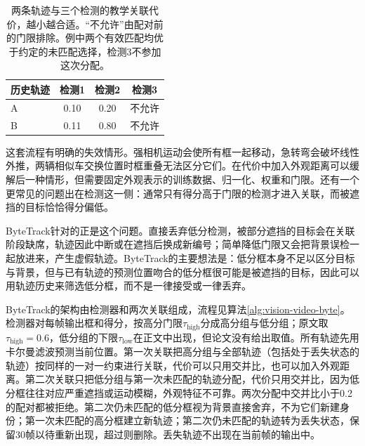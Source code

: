 \begin{table}[htbp]
  \centering
  \begin{tabular}{lccc}
    \toprule
    历史轨迹 & 检测1 & 检测2 & 检测3\\
    \midrule
    A & 0.10 & 0.20 & 不允许\\
    B & 0.11 & 0.80 & 不允许\\
    \bottomrule
  \end{tabular}
  \caption{两条轨迹与三个检测的教学关联代价，越小越合适。“不允许”由配对前的门限排除。例中两个有效匹配均优于约定的未匹配选择，检测3不参加这次分配。}
  \label{tab:vision-association-cost}
\end{table}

这套流程有明确的失效情形。强相机运动会使所有框一起移动，急转弯会破坏线性外推，两辆相似车交换位置时框重叠无法区分它们。在代价中加入外观距离可以缓解后一种情形，但需要固定外观表示的训练数据、归一化、权重和门限。还有一个更常见的问题出在检测这一侧：通常只有得分高于门限的检测才进入关联，而被遮挡的目标恰恰得分偏低。

ByteTrack针对的正是这个问题。直接丢弃低分检测，被部分遮挡的目标会在关联阶段缺席，轨迹因此中断或在遮挡后换成新编号；简单降低门限又会把背景误检一起放进来，产生虚假轨迹。ByteTrack的主要想法是：低分框本身不足以区分目标与背景，但与已有轨迹的预测位置吻合的低分框很可能是被遮挡的目标，因此可以用轨迹历史来筛选低分框，而不是一律接受或一律丢弃。

ByteTrack的架构由检测器和两次关联组成，流程见算法\ref{alg:vision-video-byte}。检测器对每帧输出框和得分，按高分门限$\tau_{\mathrm{high}}$分成高分组与低分组；原文取$\tau_{\mathrm{high}}=0.6$，低分组的下限$\tau_{\mathrm{low}}$在正文中出现，但论文没有给出取值。所有轨迹先用卡尔曼滤波预测当前位置。第一次关联把高分组与全部轨迹（包括处于丢失状态的轨迹）按同样的一对一约束进行关联，代价可以只用交并比，也可以加入外观距离。第二次关联只把低分组与第一次未匹配的轨迹分配，代价只用交并比，因为低分框往往对应严重遮挡或运动模糊，外观特征不可靠。两次分配中交并比小于0.2的配对都被拒绝。第二次仍未匹配的低分框视为背景直接舍弃，不为它们新建身份；第一次未匹配的高分框建立新轨迹；第二次仍未匹配的轨迹转为丢失状态，保留30帧以待重新出现，超过则删除。丢失轨迹不出现在当前帧的输出中。

